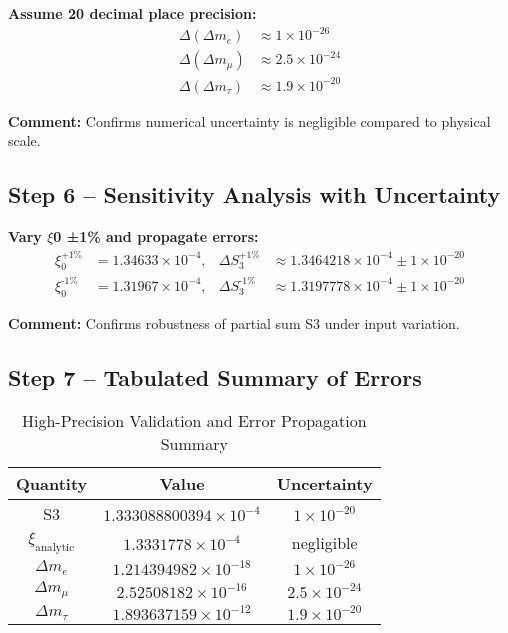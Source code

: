 \documentclass[12pt,a4paper]{article}
\begin{document}
\textbf{Assume 20 decimal place precision:}
\begin{align}
	\Delta (\Delta m_e) &\approx 1 \times 10^{-26} \\
	\Delta (\Delta m_\mu) &\approx 2.5 \times 10^{-24} \\
	\Delta (\Delta m_\tau) &\approx 1.9 \times 10^{-20}
\end{align}

\textbf{Comment:} Confirms numerical uncertainty is negligible compared to physical scale.

\subsection{Step 6 – Sensitivity Analysis with Uncertainty}

\textbf{Vary $\xi$0 ±1\% and propagate errors:}
\begin{align}
	\xi_0^\text{+1\%} &= 1.34633 \times 10^{-4}, & \Delta S_3^\text{+1\%} &\approx 1.3464218 \times 10^{-4} \pm 1 \times 10^{-20} \\
	\xi_0^\text{-1\%} &= 1.31967 \times 10^{-4}, & \Delta S_3^\text{-1\%} &\approx 1.3197778 \times 10^{-4} \pm 1 \times 10^{-20}
\end{align}

\textbf{Comment:} Confirms robustness of partial sum S3 under input variation.

\subsection{Step 7 – Tabulated Summary of Errors}

\begin{table}[h!]
	\centering
	\begin{tabular}{|c|c|c|}
		\hline
		Quantity & Value & Uncertainty \\
		\hline
		S3 & $1.333088800394 \times 10^{-4}$ & $1 \times 10^{-20}$ \\
		$\xi_\text{analytic}$ & $1.3331778 \times 10^{-4}$ & negligible \\
		$\Delta m_e$ & $1.214394982 \times 10^{-18}$ & $1 \times 10^{-26}$ \\
		$\Delta m_\mu$ & $2.52508182 \times 10^{-16}$ & $2.5 \times 10^{-24}$ \\
		$\Delta m_\tau$ & $1.893637159 \times 10^{-12}$ & $1.9 \times 10^{-20}$ \\
		\hline
	\end{tabular}
	\caption{High-Precision Validation and Error Propagation Summary}
\end{table}
\end{document}
